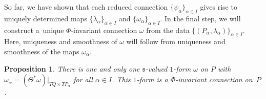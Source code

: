 \documentclass[pdftex]{sigma}
\numberwithin{equation}{section}
\newtheorem{Proposition}[Theorem]{Proposition}
\begin{document}
So far, we have shown that each reduced connection $\{\psi_\alpha\}_{\alpha \in I}$ gives rise to uniquely
determined maps $\{\lambda_\alpha\}_{\alpha \in I}$ and $\{\omega_\alpha\}_{\alpha \in I}$.
In the f\/inal step, we will construct a~unique $\Phi$-invariant connection $\omega$ from the data
$\{(P_\alpha,\lambda_\alpha)\}_{\alpha\in I}$.
Here, uniqueness and smoothness of $\omega$ will follow from uniqueness and smoothness of the maps $\omega_\alpha$.

\begin{Proposition}\label{prop:reconstr}
There is one and only one $\mathfrak{s}$-valued $1$-form $\omega$ on $P$ with
$\omega_\alpha=(\Theta^{*}\omega)|_{TQ\times TP_\alpha}$ for all $\alpha \in I$. This $1$-form is a $\Phi$-invariant connection on~$P$.
\end{Proposition}
\end{document}
